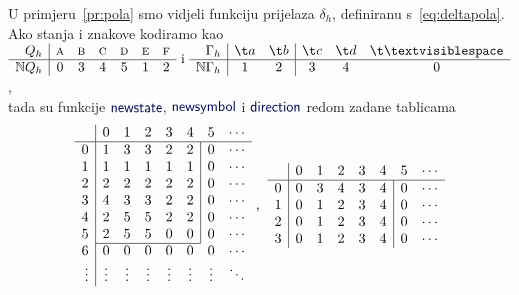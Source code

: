 \begin{primjer}[{name=[kodirana tablica prijelaza]}]\label{pr:polatable}
U primjeru~\ref{pr:pola} smo vidjeli funkciju prijelaza $\delta_h$, definiranu s~\eqref{eq:deltapola}. \\ Ako stanja i znakove kodiramo kao
$
    \begin{array}{r|cccccc}
         Q_h& \textsc a& \textsc b& \textsc c& \textsc d& \textsc e& \textsc f \\\hline
         \N Q_h& 0 & 3 & 4 & 5 & 1 & 2
    \end{array}\text{ i }
    \begin{array}{r|cc|ccc}
        \Gamma_h& \t a & \t b & \t c & \t d & \bl \\\hline
        \N\Gamma_h & 1 & 2 & 3 & 4 & 0
    \end{array}
    $,\\
tada su funkcije $\f{newstate}$, $\f{newsymbol}$ i $\f{direction}$ redom zadane tablicama
\begin{equation}
\begin{array}{r|ccccccc}
    &0&1&2&3&4&5&\cdots\\\hline
0& 1 & 3 & 3 & 2 & 2 & \multicolumn{1}{|c}{0} & \cdots\\
1& 1 & 1 & 1 & 1 & 1 & \multicolumn{1}{|c}{0} & \cdots\\
2& 2 & 2 & 2 & 2 & 2 & \multicolumn{1}{|c}{0} & \cdots\\
3& 4 & 3 & 3 & 2 & 2 & \multicolumn{1}{|c}{0} & \cdots\\
4& 2 & 5 & 5 & 2 & 2 & \multicolumn{1}{|c}{0} & \cdots\\
5& 2 & 5 & 5 & 0 & 0 & \multicolumn{1}{|c}{0} & \cdots\\ \cline{2-6}
6& 0 & 0 & 0 & 0 & 0 & 0 & \cdots\\
\vdots&\vdots&\vdots&\vdots&\vdots&\vdots&\vdots&\ddots
\end{array}\;\text,\;\;
\begin{array}{r|ccccccc}
    &0&1&2&3&4&5&\cdots\\\hline
0& 0 & 3 & 4 & 3 & 4 & \multicolumn{1}{|c}{0} & \cdots\\
1& 0 & 1 & 2 & 3 & 4 & \multicolumn{1}{|c}{0} & \cdots\\
2& 0 & 1 & 2 & 3 & 4 & \multicolumn{1}{|c}{0} & \cdots\\
3& 0 & 1 & 2 & 3 & 4 & \multicolumn{1}{|c}{0} & \cdots\\

\end{array}
\end{equation}
\end{primjer}
